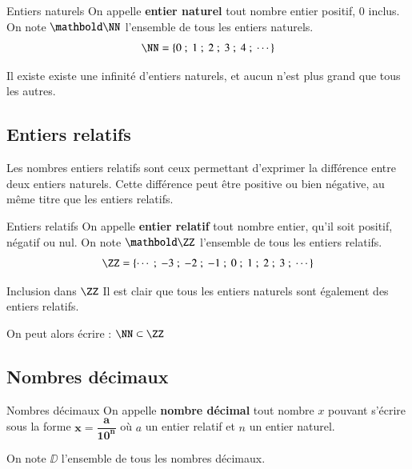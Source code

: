 \documentclass[oneside,12pt]{article}          %
\begin{document}
\begin{minipage}{0.6\linewidth}
    \begin{definition}{Entiers naturels}
    		On appelle \textbf{entier naturel} tout nombre entier positif, 0 inclus. On note $\mathbold\NN$ l'ensemble de tous les entiers naturels.
    \[ \NN=\{0~;~1~;~2~;~3~;~4~;~\cdots\} \]
    \end{definition}
\end{minipage}
\begin{minipage}{0.35\linewidth}
    \begin{remarque}
    		Il existe existe une infinité d'entiers naturels, et aucun n'est plus grand que tous les autres.
    \end{remarque}
\end{minipage}



\subsection{Entiers relatifs}
Les nombres entiers relatifs sont ceux permettant d'exprimer la différence entre deux entiers naturels. Cette différence peut être positive ou bien négative, au même titre que les entiers relatifs.

\begin{definition}{Entiers relatifs}
	On appelle \textbf{entier relatif} tout nombre entier, qu'il soit positif, négatif ou nul. On note $\mathbold \ZZ$ l'ensemble de tous les entiers relatifs.
	\[ \ZZ=\{\cdots~;~-3~;~-2~;~-1~;~0~;~1~;~2~;~3~;~\cdots\} \]
\end{definition}



\begin{propriete}{Inclusion dans $\ZZ$}
	Il est clair que tous les entiers naturels sont également des entiers relatifs. 
	
	On peut alors écrire : $\NN\subset\ZZ$
\end{propriete}


\subsection{Nombres décimaux}

\begin{definition}{Nombres décimaux}
	On appelle \textbf{nombre décimal} tout nombre $x$ pouvant s'écrire sous la forme $\mathbold{x=\dfrac{a}{10^n}}$ où $a$ un entier relatif et $n$ un entier naturel.

	On note $\mathbold\DD$ l'ensemble de tous les nombres décimaux.
\end{definition}
\end{document}
